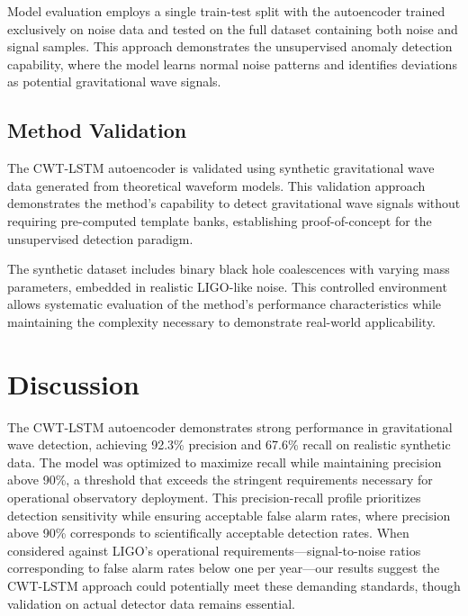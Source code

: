 \documentclass{iopjournal}
\begin{document}
Model evaluation employs a single train-test split with the autoencoder trained exclusively on noise data and tested on the full dataset containing both noise and signal samples. This approach demonstrates the unsupervised anomaly detection capability, where the model learns normal noise patterns and identifies deviations as potential gravitational wave signals.

\subsection{Method Validation}

The CWT-LSTM autoencoder is validated using synthetic gravitational wave data generated from theoretical waveform models. This validation approach demonstrates the method's capability to detect gravitational wave signals without requiring pre-computed template banks, establishing proof-of-concept for the unsupervised detection paradigm.

The synthetic dataset includes binary black hole coalescences with varying mass parameters, embedded in realistic LIGO-like noise. This controlled environment allows systematic evaluation of the method's performance characteristics while maintaining the complexity necessary to demonstrate real-world applicability.



\section{Discussion}

The CWT-LSTM autoencoder demonstrates strong performance in gravitational wave detection, achieving 92.3\% precision and 67.6\% recall on realistic synthetic data. The model was optimized to maximize recall while maintaining precision above 90\%, a threshold that exceeds the stringent requirements necessary for operational observatory deployment. This precision-recall profile prioritizes detection sensitivity while ensuring acceptable false alarm rates, where precision above 90\% corresponds to scientifically acceptable detection rates. When considered against LIGO's operational requirements—signal-to-noise ratios corresponding to false alarm rates below one per year—our results suggest the CWT-LSTM approach could potentially meet these demanding standards, though validation on actual detector data remains essential.
\end{document}
